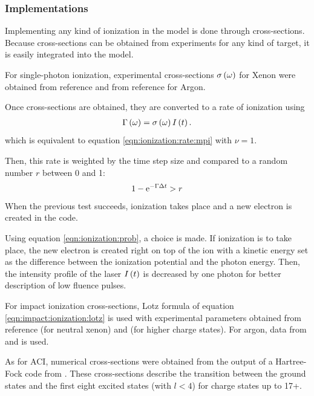\subsubsection{Implementations}
\label{section:intro:md:implementation}


Implementing any kind of ionization in the model is done through cross-sections.
Because cross-sections can be obtained from experiments for any kind of target,
it is easily integrated into the model.


For single-photon ionization, experimental cross-sections $\sigma\left( \omega \right)$
for Xenon were obtained from reference \cite{West1978} and from
reference \cite{Marr1976} for Argon.

Once cross-sections are obtained, they are converted to a rate of ionization
using
\begin{align}
\Gamma\left( \omega \right) = \sigma\left( \omega \right) I\left( t \right).
\label{eqn:ionization:rate:single}
\end{align}
which is equivalent to equation \eqref{eqn:ionization:rate:mpi} with $\nu = 1$.

Then, this rate is weighted\cite{Lax2006} by the time step size and compared to
a random number $r$ between 0 and 1:
\begin{align}
1 - \textrm{e}^{-\Gamma \Delta t} > r
\label{eqn:ionization:prob}
\end{align}
When the previous test succeeds, ionization takes place and a new electron is
created in the code.

Using equation \eqref{eqn:ionization:prob}, a choice is made. If ionization is
to take place, the new electron is created right on top of the ion with a
kinetic energy set as the difference between the ionization potential and the
photon energy. Then, the intensity profile of the laser $I\left( t \right)$ is decreased
by one photon for better description of low fluence pulses.

For impact ionization cross-sections, Lotz formula of equation
\eqref{eqn:impact:ionization:lotz} is used with experimental parameters obtained
from reference \cite{Tawara1987} (for neutral xenon) and \cite{Heidenreich2005}
(for higher charge states). For argon, data from \cite{Lotz1967} and
\cite{Lotz1970} is used.

As for ACI, numerical cross-sections were obtained from the output of a
Hartree-Fock code from \cite{CowanCode}. These cross-sections describe the
transition between the ground states and the first eight excited states (with
$l<4$) for charge states up to 17+.

